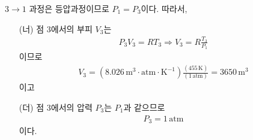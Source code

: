 \documentclass[floatfix,nofootinbib,superscriptaddress,fleqn]{revtex4}
\begin{document}
$3\to 1$ 과정은 등압과정이므로 $P_1=P_3$이다. 따라서,
\begin{itemize}
  \item[(너)] 점 3에서의 부피 $V_3$는
  \begin{align}
    P_3V_3 = RT_3 \Longrightarrow V_3 = R\frac{T_3}{P_1}
  \end{align}
  이므로
  \begin{align}
    V_3 = (8.026\,\mathrm{m^3\cdot atm \cdot K^{-1}})
    \frac{(455\,\mathrm{K})}{(1\,\mathrm{atm})} 
    = 3650\,\mathrm{m^3}
  \end{align}
  이고
  \item[(더)] 
  점 3에서의 압력 $P_3$는 $P_1$과 같으므로
  \begin{align}
    P_3 = 1\,\mathrm{atm}
  \end{align}
  이다.
  \end{itemize}



\vspace{1cm}
\end{document}
